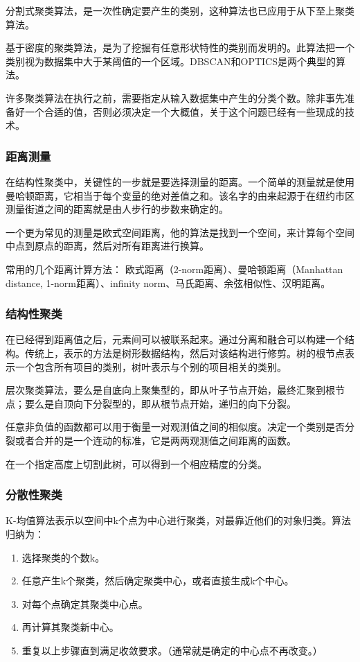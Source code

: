 \documentclass[11pt,a4paper,twoside]{book}
\begin{document}
分割式聚类算法，是一次性确定要产生的类别，这种算法也已应用于从下至上聚类算法。

基于密度的聚类算法，是为了挖掘有任意形状特性的类别而发明的。此算法把一个类别视为数据集中大于某阈值的一个区域。DBSCAN和OPTICS是两个典型的算法。

许多聚类算法在执行之前，需要指定从输入数据集中产生的分类个数。除非事先准备好一个合适的值，否则必须决定一个大概值，关于这个问题已经有一些现成的技术。
\subsubsection{距离测量}
在结构性聚类中，关键性的一步就是要选择测量的距离。一个简单的测量就是使用曼哈顿距离，它相当于每个变量的绝对差值之和。该名字的由来起源于在纽约市区测量街道之间的距离就是由人步行的步数来确定的。

一个更为常见的测量是欧式空间距离，他的算法是找到一个空间，来计算每个空间中点到原点的距离，然后对所有距离进行换算。

常用的几个距离计算方法： 欧式距离（2-norm距离）、曼哈顿距离（Manhattan distance, 1-norm距离）、infinity norm、马氏距离、余弦相似性、汉明距离。
\subsubsection{结构性聚类}
在已经得到距离值之后，元素间可以被联系起来。通过分离和融合可以构建一个结构。传统上，表示的方法是树形数据结构，然后对该结构进行修剪。树的根节点表示一个包含所有项目的类别，树叶表示与个别的项目相关的类别。

层次聚类算法，要么是自底向上聚集型的，即从叶子节点开始，最终汇聚到根节点；要么是自顶向下分裂型的，即从根节点开始，递归的向下分裂。

任意非负值的函数都可以用于衡量一对观测值之间的相似度。决定一个类别是否分裂或者合并的是一个连动的标准，它是两两观测值之间距离的函数。

在一个指定高度上切割此树，可以得到一个相应精度的分类。
\subsubsection{分散性聚类}
K-均值算法表示以空间中k个点为中心进行聚类，对最靠近他们的对象归类。算法归纳为：
\begin{enumerate}
  \item 选择聚类的个数k。
  \item 任意产生k个聚类，然后确定聚类中心，或者直接生成k个中心。
  \item 对每个点确定其聚类中心点。
  \item 再计算其聚类新中心。
  \item 重复以上步骤直到满足收敛要求。（通常就是确定的中心点不再改变。）
\end{enumerate}
\end{document}
